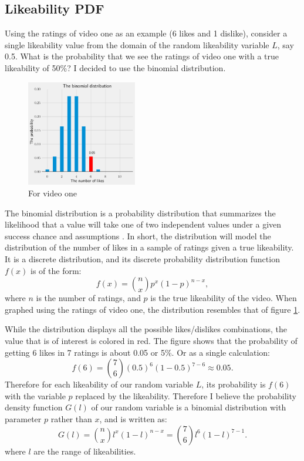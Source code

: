 \documentclass[a4paper,11pt]{article}
\begin{document}
\subsection{Likeability PDF}
Using the ratings of video one as an example (6 likes and 1 dislike), consider a single likeability value from the domain of the random likeability variable $L$, say 0.5. What is the probability that we see the ratings of video one with a true likeability of 50\%? I decided to use the binomial distribution.

\begin{figure}
    \includegraphics[width=0.43\textwidth,right]{assets/bino_pdfs.png}
    \caption{For video one}
    \label{fig:bino}
\end{figure}

The binomial distribution is a probability distribution that summarizes the likelihood that a value will take one of two independent values under a given success chance and assumptions \parencite{barone_2021}. In short, the distribution will model the distribution of the number of likes in a sample of ratings given a true likeability. It is a discrete distribution, and its discrete probability distribution function $f(x)$ is of the form:
\[
    f(x) = {n \choose x} p^x (1-p)^{n-x},
\]
where $n$ is the number of ratings, and $p$ is the true likeability of the video. When graphed using the ratings of video one, the distribution resembles that of figure \ref{fig:bino}.

While the distribution displays all the possible likes/dislikes combinations, the value that is of interest is colored in red. The figure shows that the probability of getting 6 likes in 7 ratings is about 0.05 or 5\%. Or as a single calculation:
\[
    f(6) = {7 \choose 6} (0.5)^6 (1-0.5)^{7-6} \approx 0.05.
\]
Therefore for each likeability of our random variable $L$, its probability is $f(6)$ with the variable $p$ replaced by the likeability. Therefore I believe the probability density function $G(l)$ of our random variable is a binomial distribution with parameter $p$ rather than $x$, and is written as:
\[
    G(l) = {n \choose x} l^x (1-l)^{n-x} = {7 \choose 6} l^6 (1-l) ^{7-1}.
\]
where $l$ are the range of likeabilities.
\end{document}
